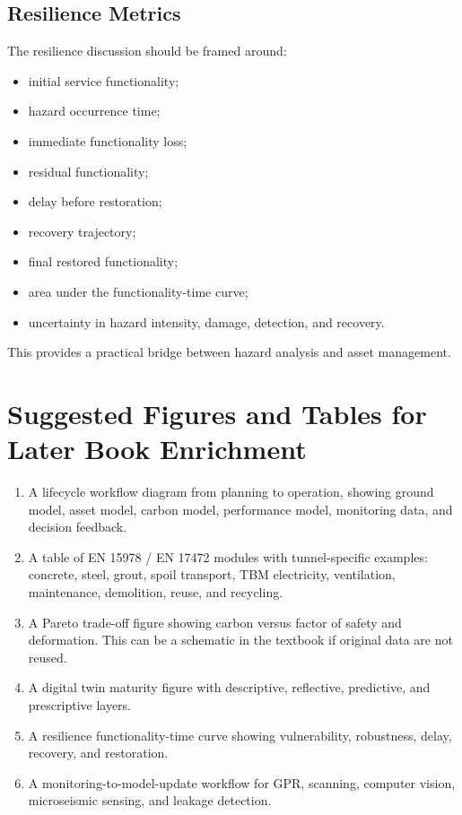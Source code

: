 \documentclass[11pt]{article}
\begin{document}
\subsection*{Resilience Metrics}

The resilience discussion should be framed around:

\begin{itemize}
  \item initial service functionality;
  \item hazard occurrence time;
  \item immediate functionality loss;
  \item residual functionality;
  \item delay before restoration;
  \item recovery trajectory;
  \item final restored functionality;
  \item area under the functionality-time curve;
  \item uncertainty in hazard intensity, damage, detection, and recovery.
\end{itemize}

This provides a practical bridge between hazard analysis and asset management.

\section{Suggested Figures and Tables for Later Book Enrichment}

\begin{enumerate}
  \item A lifecycle workflow diagram from planning to operation, showing
  ground model, asset model, carbon model, performance model, monitoring data,
  and decision feedback.
  \item A table of EN 15978 / EN 17472 modules with tunnel-specific examples:
  concrete, steel, grout, spoil transport, TBM electricity, ventilation,
  maintenance, demolition, reuse, and recycling.
  \item A Pareto trade-off figure showing carbon versus factor of safety and
  deformation. This can be a schematic in the textbook if original data are not
  reused.
  \item A digital twin maturity figure with descriptive, reflective, predictive,
  and prescriptive layers.
  \item A resilience functionality-time curve showing vulnerability,
  robustness, delay, recovery, and restoration.
  \item A monitoring-to-model-update workflow for GPR, scanning, computer
  vision, microseismic sensing, and leakage detection.
\end{enumerate}
\end{document}
